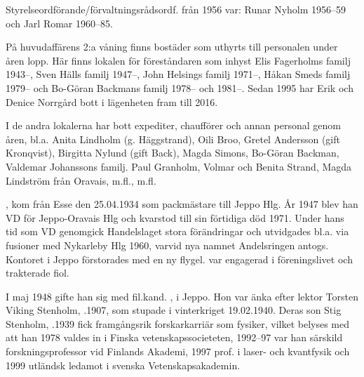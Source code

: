 Styrelseordförande/förvaltningsrådsordf. från 1956 var: Runar Nyholm 1956--59 och Jarl Romar 1960--85.


På huvudaffärens 2:a våning finns bostäder som uthyrts till personalen under åren lopp. Här finns lokalen för föreståndaren som inhyst Elis Fagerholms familj 1943--, Sven Hälls familj 1947--, John Helsings familj 1971--, Håkan Smeds familj 1979-- och Bo-Göran Backmans familj 1978-- och 1981--. Sedan 1995 har Erik och Denice Norrgård bott i lägenheten fram till 2016.

I de andra lokalerna har bott expediter, chaufförer och annan personal genom åren, bl.a. Anita Lindholm (g. Häggstrand), Oili Broo, Gretel Andersson (gift Kronqvist), Birgitta Nylund (gift Back), Magda Simons, Bo-Göran Backman, Valdemar Johanssons familj. Paul Granholm, Volmar och Benita Strand, Magda Lindström från Oravais, m.fl., m.fl.

, kom från Esse den 25.04.1934 som packmästare till Jeppo Hlg. År 1947 blev han VD för Jeppo-Oravais Hlg och kvarstod till sin förtidiga död 1971. Under hans tid som VD genomgick Handelslaget stora förändringar och utvidgades bl.a. via fusioner med Nykarleby Hlg 1960, varvid nya namnet Andelsringen antogs. Kontoret i Jeppo förstorades med en ny flygel.  var engagerad i föreningslivet och trakterade fiol.

I maj 1948 gifte han sig med fil.kand. , i Jeppo. Hon var änka efter lektor Torsten Viking Stenholm, .1907, som stupade i vinterkriget 19.02.1940. Deras son Stig Stenholm, .1939 fick framgångsrik forskarkarriär som fysiker, vilket belyses med att han 1978 valdes in i Finska vetenskapssocieteten, 1992--97 var han särskild forskningsprofessor vid Finlands Akademi, 1997 prof. i laser- och kvantfysik och 1999 utländsk ledamot i svenska Vetenskapsakademin.

